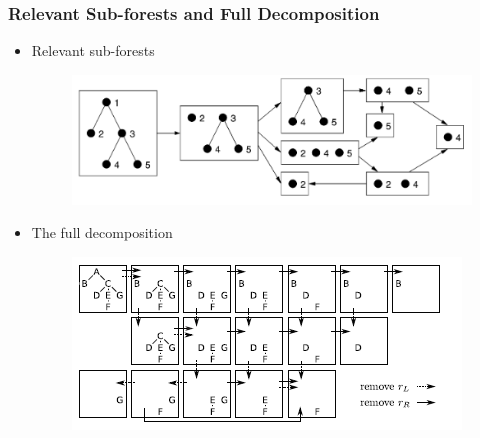 \documentclass{beamer}
\begin{document}
\begin{frame}
\frametitle{Relevant Sub-forests and Full Decomposition}
\begin{itemize}
\item  Relevant sub-forests
\begin{figure}
	\includegraphics[width=0.6\linewidth]{LeftmostPathDecomposition}
	\centering
\end{figure}
\item The full decomposition
\begin{figure}
	\includegraphics[width=0.6\linewidth]{FullDecomposition}
	\centering
\end{figure}
\end{itemize}
\end{frame}
\end{document}
